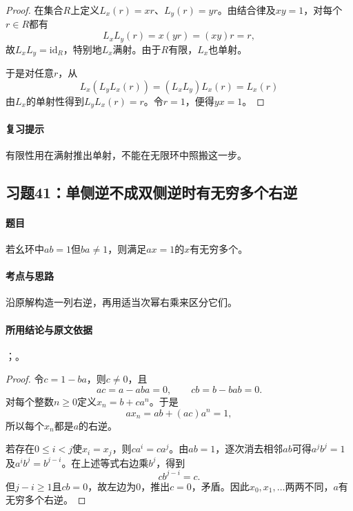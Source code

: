 
\begin{proof}
在集合$R$上定义$L_x(r)=xr$、$L_y(r)=yr$。由结合律及$xy=1$，对每个$r\in R$都有
\[
L_xL_y(r)=x(yr)=(xy)r=r,
\]
故$L_xL_y=\mathrm{id}_R$，特别地$L_x$满射。由于$R$有限，$L_x$也单射。

于是对任意$r$，从
\[
L_x(L_yL_x(r))=(L_xL_y)L_x(r)=L_x(r)
\]
由$L_x$的单射性得到$L_yL_x(r)=r$。令$r=1$，便得$yx=1$。
\end{proof}

\paragraph{复习提示}
有限性用在满射推出单射，不能在无限环中照搬这一步。


\subsection{习题41：\texorpdfstring{单侧逆不成双侧逆时有无穷多个右逆}{单侧逆不成双侧逆时有无穷多个右逆}}
\label{ex:1:41}

\paragraph{题目}
若幺环中$ab=1$但$ba\neq1$，则满足$ax=1$的$x$有无穷多个。

\paragraph{考点与思路}
沿原解构造一列右逆，再用适当次幂右乘来区分它们。

\paragraph{所用结论与原文依据}
；。


\begin{proof}
令$c=1-ba$，则$c\ne0$，且
\[
ac=a-aba=0,\qquad cb=b-bab=0.
\]
对每个整数$n\geq0$定义$x_n=b+ca^n$。于是
\[
ax_n=ab+(ac)a^n=1,
\]
所以每个$x_n$都是$a$的右逆。

若存在$0\leq i<j$使$x_i=x_j$，则$ca^i=ca^j$。由$ab=1$，逐次消去相邻$ab$可得$a^jb^j=1$及$a^ib^j=b^{j-i}$。在上述等式右边乘$b^j$，得到
\[
cb^{j-i}=c.
\]
但$j-i\geq1$且$cb=0$，故左边为0，推出$c=0$，矛盾。因此$x_0,x_1,\ldots$两两不同，$a$有无穷多个右逆。
\end{proof}


